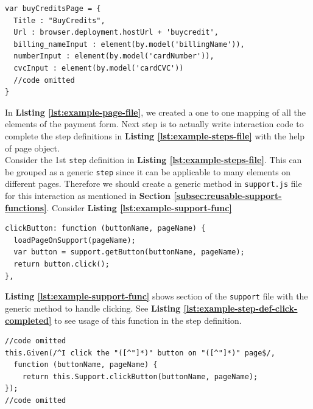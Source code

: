 \begin{listing}[H]
\begin{verbatim}
var buyCreditsPage = {
  Title : "BuyCredits",
  Url : browser.deployment.hostUrl + 'buycredit',
  billing_nameInput : element(by.model('billingName')),
  numberInput : element(by.model('cardNumber')),
  cvcInput : element(by.model('cardCVC'))
  //code omitted
}
\end{verbatim}
\label{lst:example-page-file}
\end{listing}

In \textbf{Listing \ref{lst:example-page-file}}, we created a one to one mapping of all the elements of the payment form. Next step is to actually write interaction code to complete the step definitions in \textbf{Listing \ref{lst:example-steps-file}} with the help of page object.\\

Consider the 1st \texttt{step} definition in \textbf{Listing \ref{lst:example-steps-file}}. This can be grouped as a generic \texttt{step} since it can be applicable to many elements on different pages. Therefore we should create a generic method in \texttt{support.js} file for this interaction as mentioned in  \textbf{Section \ref{subsec:reusable-support-functions}}. Consider  \textbf{Listing \ref{lst:example-support-func}}

\begin{listing}[H]
\begin{verbatim}
clickButton: function (buttonName, pageName) {
  loadPageOnSupport(pageName);
  var button = support.getButton(buttonName, pageName);
  return button.click();
},
\end{verbatim}
\label{lst:example-support-func}
\end{listing}

\textbf{Listing \ref{lst:example-support-func}} shows section of the \texttt{support} file with the generic method to handle clicking. See \textbf{Listing \ref{lst:example-step-def-click-completed}} to see usage of this function in the step definition.

\begin{listing}[H]
\begin{verbatim}
//code omitted
this.Given(/^I click the "([^"]*)" button on "([^"]*)" page$/,
  function (buttonName, pageName) {
    return this.Support.clickButton(buttonName, pageName);
});
//code omitted
\end{verbatim}
\label{lst:example-step-def-click-completed}
\end{listing}

